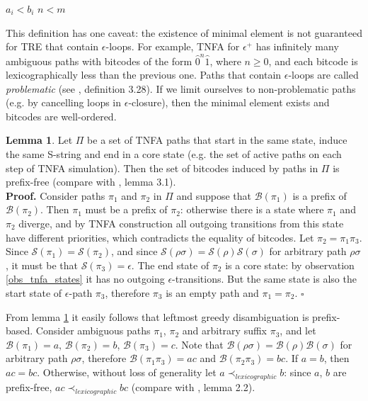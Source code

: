 \documentclass{article}
\newcommand{\Xeq}{\!=\!}
\newcommand{\XB}{\mathcal{B}}
\newcommand{\XS}{\mathcal{S}}
\theoremstyle{definition}
\newtheorem{XLem}{Lemma}
\begin{document}
\begin{multicols}{2}
    \begin{algorithm}[H] \DontPrintSemicolon {} 
     {
        \For {$i \Xeq \overline{1, min(n, m)}$} {
             { \Return $a_i \!<\! b_i$  }
        }
        \Return $n \!<\! m$ \;
    }
    \end{algorithm}

This definition has one caveat: the existence of minimal element is not guaranteed for TRE that contain $\epsilon$-loops.
For example, TNFA for $\epsilon^+$ has infinitely many ambiguous paths with bitcodes
of the form $\widehat{0}^n \widehat{1}$, where $n \!\geq\! 0$,
and each bitcode is lexicographically less than the previous one.
Paths that contain $\epsilon$-loops are called \emph{problematic} (see \cite{Gra15}, definition 3.28).
If we limit ourselves to non-problematic paths (e.g. by cancelling loops in $\epsilon$-closure),
then the minimal element exists and bitcodes are well-ordered.

\begin{XLem}\label{lemma_bitcodes}
Let $\Pi$ be a set of TNFA paths that start in the same state, induce the same S-string and end in a core state
(e.g. the set of active paths on each step of TNFA simulation).
Then the set of bitcodes induced by paths in $\Pi$ is prefix-free
(compare with \cite{Gra15}, lemma 3.1).
\\[0.5em]
\textbf{Proof.}
Consider paths $\pi_1$ and $\pi_2$ in $\Pi$
and suppose that $\XB(\pi_1)$ is a prefix of $\XB(\pi_2)$.
Then $\pi_1$ must be a prefix of $\pi_2$: otherwise there is a state where $\pi_1$ and $\pi_2$ diverge,
and by TNFA construction all outgoing transitions from this state have different priorities,
which contradicts the equality of bitcodes.
Let $\pi_2 \Xeq \pi_1 \pi_3$.
Since $\XS(\pi_1) \Xeq \XS(\pi_2)$, and since $\XS(\rho\sigma) \Xeq \XS(\rho)\XS(\sigma)$ for arbitrary path $\rho\sigma$,
it must be that $\XS(\pi_3) \Xeq \epsilon$.
The end state of $\pi_2$ is a core state: by observation \ref{obs_tnfa_states} it has no outgoing $\epsilon$-transitions.
But the same state is also the start state of $\epsilon$-path $\pi_3$, therefore $\pi_3$ is an empty path and $\pi_1 \Xeq \pi_2$.
$\square$
\end{XLem}

From lemma \ref{lemma_bitcodes} it easily follows that leftmost greedy disambiguation is prefix-based.
Consider ambiguous paths $\pi_1$, $\pi_2$ and arbitrary suffix $\pi_3$,
and let $\XB(\pi_1) \Xeq a$, $\XB(\pi_2) \Xeq b$, $\XB(\pi_3) \Xeq c$.
Note that $\XB(\rho\sigma) \Xeq \XB(\rho)\XB(\sigma)$ for arbitrary path $\rho\sigma$,
therefore $\XB(\pi_1\pi_3) \Xeq ac$ and $\XB(\pi_2\pi_3) \Xeq bc$.
If $a \Xeq b$, then $ac \Xeq bc$.
Otherwise, without loss of generality let $a \prec_{lexicographic} b$: since $a$, $b$ are prefix-free, $ac \prec_{lexicographic} bc$
(compare with \cite{Gra15}, lemma 2.2).
\\


\end{multicols}
\end{document}
